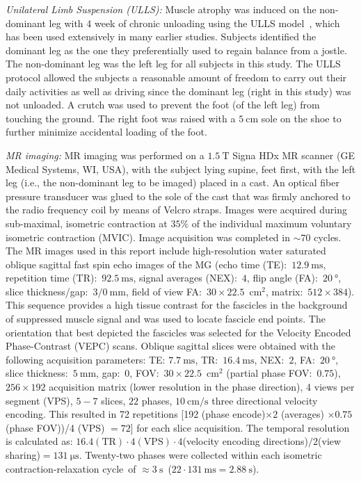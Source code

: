 \textit{Unilateral Limb Suspension (ULLS):}
Muscle atrophy was induced on the non-dominant leg with 4 week of chronic unloading using the ULLS model~\cite{RNS19}, which has been used extensively in many earlier studies.
Subjects identified the dominant leg as the one they preferentially used to regain balance from a jostle. 
The non-dominant leg was the left leg for all subjects in this study. 
The ULLS protocol allowed the subjects a reasonable amount of freedom to carry out their daily activities as well as driving since the dominant leg (right in this study) was not unloaded. 
A crutch was used to prevent the foot (of the left leg) from touching the ground. 
The right foot was raised with a $\SI{5}{\centi\meter}$ sole on the shoe to further minimize accidental loading of the foot.

\textit{MR imaging:}
MR imaging was performed on a $\SI{1.5}{\tesla}$ Signa HDx MR scanner (GE Medical Systems, WI, USA), with the subject lying supine, feet first, with the left leg (i.e., the non-dominant leg to be imaged) placed in a cast.
An optical fiber pressure transducer was glued to the sole of the cast that was firmly anchored to the radio frequency coil by means of Velcro straps.
Images were acquired during sub-maximal, isometric contraction at $35\%$ of the individual maximum voluntary isometric contraction (MVIC). 
Image acquisition was completed in $\sim 70$ cycles.
The MR images used in this report include high-resolution water saturated oblique sagittal fast spin echo images of the MG (echo time (TE):~$\SI{12.9}{\milli\second}$, repetition time (TR):~$\SI{92.5}{\milli\second}$, signal averages (NEX):~$4$, flip angle (FA):~$\SI{20}{\degree}$, slice thickness/gap:~$3/\SI{0}{\milli\meter}$, field of view {FA}:~$30 \times 22.5 \; \SI{}{\centi\meter^2}$, matrix:~$512 \times 384$). 
This sequence provides a high tissue contrast for the fascicles in the background of suppressed muscle signal and was used to locate fascicle end points. 
The orientation that best depicted the fascicles was selected for the Velocity Encoded Phase-Contrast (VEPC) scans. 
Oblique sagittal slices were obtained with the following acquisition parameters: TE: $\SI{7.7}{\milli\second}$, TR:~$\SI{16.4}{\milli\second}$, NEX:~$2$, FA:~$\SI{20}{\degree}$, slice thickness:~$\SI{5}{\milli\meter}$, gap:~0, FOV:~$30 \times 22.5 \; \SI{}{\centi\meter^2}$ (partial phase FOV:~$0.75$), $256 \times 192$ acquisition matrix (lower resolution in the phase direction), 4 views per segment (VPS), $5-7$ slices, $22$ phases, $\SI{10}{\centi\meter/\second}$ three directional velocity encoding. 
This resulted in 72 repetitions [192 (phase encode)$ \times 2$ (averages) $\times 0.75$ (phase FOV))/4 (VPS) $= 72$] for each slice acquisition. 
The temporal resolution is calculated as: $16.4(\mathrm{TR})\cdot 4(\mathrm{VPS})\cdot 4$(velocity encoding directions)$/2$(view sharing)$= \SI{131}{\micro\second}$. 
Twenty-two phases were collected within each isometric contraction-relaxation cycle~of $\approx\SI{3}{\second}$~($22\cdot \SI{131}{\milli\second} = \SI{2.88}{\second}$). 

